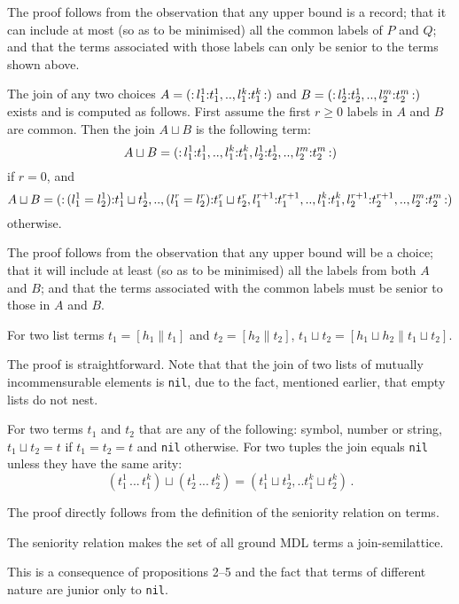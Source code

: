 \documentclass[11pt]{report}
\begin{document}
The proof follows from the observation that any upper bound is a record; that it can include at most (so as to be minimised) all the common labels of $P$ and $Q$; and that the terms associated with those labels can only be senior to the terms shown above.


\begin{prop}
The join of any two choices $A=\hbox{\rm (:}\,l^1_1\hbox{\rm :}t_1^1,..,l^k_1\hbox{\rm :}t^k_1\,\hbox{\rm :)}$ and
$B=\hbox{\rm (:}\,l^1_2\hbox{\rm :}t^1_2,..,l^m_2\hbox{\rm :}t^m_2\,\hbox{\rm :)}$ exists and is computed as follows.
First assume the first $r\ge0$ labels in $A$ and $B$ are common.
Then the join $A\sqcup B$ is the following term:
\[
A\sqcup B = \hbox{\rm (:}\,l^1_1\hbox{\rm :}t_1^1,..,l^{k}_1\hbox{\rm :}t^{k}_1, l^1_2\hbox{\rm :}t^1_2,..,l^{m}_2\hbox{\rm :}t^{m}_2\,\hbox{\rm :)}
\]
if $r=0$, and
\[
A\sqcup B = \hbox{\rm (:}\,
(l^{1}_1=l^1_2)\hbox{\rm :}t^{1}_1\sqcup t^{1}_2
,..,(l^{r}_1=l^{r}_2)\hbox{\rm :}t^{r}_1\sqcup t^{r}_2,
l^{r+1}_1\hbox{\rm :}t^{r+1}_1,..,l^{k}_1\hbox{\rm :}t^{k}_1,
l^{r+1}_2\hbox{\rm :}t^{r+1}_2,..,l^{m}_2\hbox{\rm :}t^{m}_2
 \,\hbox{\rm :)}
\]
otherwise.
\end{prop}
The proof follows from the observation that any upper bound will be a choice; that it will include at least (so as to be minimised) all the labels from both $A$ and $B$; and that the terms associated with the common labels must be senior to those in $A$ and $B$.

\begin{prop}
For two list terms $t_1=[h_1\|t_1]$ and $t_2=[h_2\|t_2]$,  $t_1\sqcup t_2 =[h_1\sqcup h_2 \| t_1\sqcup t_2]$.
\end{prop}
The proof is straightforward. Note that that the join of two lists of mutually incommensurable elements is \verb$nil$,
due to the fact, mentioned earlier, that empty lists do not nest.  

\begin{prop}
For two terms $t_1$ and $t_2$ that are any of the following: symbol, number or string,
$t_1\sqcup t_2 = t$ if $t_1=t_2=t$ and \verb"nil" otherwise. For two tuples the join equals
\verb"nil" unless they have the same arity:
\[
(t^1_1\,...\,t^k_1) \sqcup (t^1_2\,...\,t^k_2) = (t^1_1\sqcup t^1_2,..t^k_1\sqcup t^k_2)\,.
\]
\end{prop}
The proof directly follows from the definition of the seniority relation on terms.

\begin{prop}
The seniority relation makes the set of all ground MDL terms a join-semilattice.
\end{prop}
This is a consequence of propositions 2--5 and the fact that terms of different nature are junior only to \verb$nil$.
\end{document}
